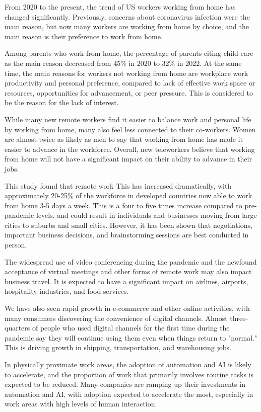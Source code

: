 \documentclass[12pt]{article}
\begin{document}
From 2020 to the present, the trend of US workers working from home has changed
significantly. Previously, concerns about coronavirus infection were the main
reason, but now many workers are working from home by choice, and the main
reason is their preference to work from home.

Among parents who work from home, the percentage of parents citing child care
as the main reason decreased from 45\% in 2020 to 32\% in 2022. At the same
time, the main reasons for workers not working from home are workplace work
productivity and personal preference, compared to lack of effective work space
or resources, opportunities for advancement, or peer pressure. This is
considered to be the reason for the lack of interest.

While many new remote workers find it easier to balance work and personal life
by working from home, many also feel less connected to their co-workers. Women
are almost twice as likely as men to say that working from home has made it
easier to advance in the workforce. Overall, new teleworkers believe that
working from home will not have a significant impact on their ability to
advance in their jobs.

This study \cite{future_of_work} found that remote work This has increased
dramatically,
with approximately
20-25\% of the workforce in developed countries now able to work from home 3-5
days a week. This is a four to five times increase compared to pre-pandemic
levels, and could result in individuals and businesses moving from large cities
to suburbs and small cities. However, it has been shown that negotiations,
important business decisions, and brainstorming sessions are best conducted in
person.

The widespread use of video conferencing during the pandemic and the newfound
acceptance of virtual meetings and other forms of remote work may also impact
business travel. It is expected to have a significant impact on airlines,
airports, hospitality industries, and food services.

We have also seen rapid growth in e-commerce and other online activities, with
many consumers discovering the convenience of digital channels. Almost
three-quarters of people who used digital channels for the first time during
the pandemic say they will continue using them even when things return to
"normal." This is driving growth in shipping, transportation, and warehousing
jobs.

In physically proximate work areas, the adoption of automation and AI is likely
to accelerate, and the proportion of work that primarily involves routine tasks
is expected to be reduced. Many companies are ramping up their investments in
automation and AI, with adoption expected to accelerate the most, especially in
work areas with high levels of human interaction.
\end{document}
